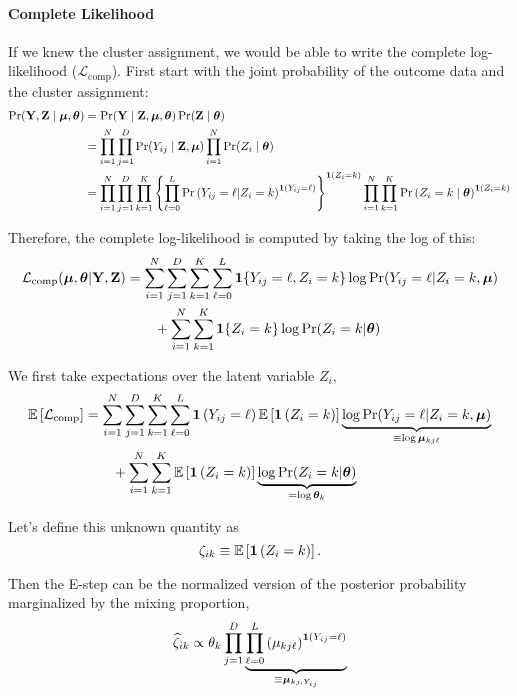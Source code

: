 \documentclass[11pt]{article}
\begin{document}
\paragraph{Complete Likelihood} If we knew the cluster assignment, we would be able to write the complete log-likelihood (\(\mathcal{L}_{\text{comp}}\)). First start with the joint probability of the outcome data and the cluster assignment:
\begin{align}
\Pr(\mathbf{Y}, \mathbf{Z} \mid \bm{\mu}, \bm{\theta}) &= \Pr(\mathbf{Y} \mid \mathbf{Z}, \bm{\mu}, \bm{\theta})\Pr(\mathbf{Z} \mid \bm{\theta})\nonumber\\
&= \prod^{N}_{i=1}\prod^{D}_{j=1}\Pr(Y_{ij} \mid \mathbf{Z}, \bm{\mu}) \prod^N_{i=1}\Pr(Z_i \mid \bm{\theta})\nonumber\\
&= \prod^{N}_{i=1}\prod^{D}_{j=1}\prod^{K}_{k=1}\left\{\prod^{L}_{\ell=0}\mathbb{\Pr}\left(Y_{ij} = \ell | Z_i = k\right)^{\bm{1}\left(Y_{ij} = \ell\right)}\right\}^{\bm{1}\left(Z_i=k\right)} \prod^N_{i=1}\prod^K_{k=1}\mathbb{\Pr}\left(Z_i = {k} \mid \bm{\theta}\right)^{\bm{1}\left(Z_i = k\right)}\nonumber
\end{align}

Therefore, the complete log-likelihood is computed by taking the log of this:
\begin{align}
\mathcal{L}_{\text{comp}}(\bm{\mu}, \bm{\theta}|\mathbf{Y}, \mathbf{Z})
& = \sum^{N}_{i=1}\sum^{D}_{j=1}\sum^{K}_{k=1}\sum^{L}_{\ell = 0}
\bm{1}\{Y_{ij} = \ell, Z_{i} = k\}
\log \Pr(Y_{ij} = \ell | Z_{i} = k, \bm{\mu})\nonumber\\
& \qquad +
\sum^N_{i=1}\sum^{K}_{k=1}\bm{1}\{Z_{i} = k\}\log \Pr(Z_{i} = k | \bm{\theta})
\end{align}

We first take expectations over the latent variable $Z_{i}$,
\begin{align}
\mathbb{E}\left[\mathcal{L}_{\text{comp}}\right]
& = \sum^{N}_{i=1}\sum^{D}_{j=1}\sum^{K}_{k=1}\sum^{L}_{\ell = 0}
\bm{1}\left(Y_{ij} = \ell\right) \mathbb{E}\left[\bm{1}\left(Z_{i} = k\right)\right]
\underbrace{\log \Pr(Y_{ij} = \ell | Z_{i} = k, \bm{\mu})}_{\equiv \log\bm{\mu}_{kj\ell}}
\nonumber\\
& \qquad +
\sum^{N}_{i=1}\sum^{K}_{k=1}\mathbb{E}\left[\bm{1}\left(Z_{i} = k\right)\right]\underbrace{\log \Pr(Z_{i} = k | \bm{\theta})}_{= \log \bm{\theta}_{k}} \label{eq:Elik}
\end{align}

 Let's define this unknown quantity as 
\[\zeta_{ik} \equiv \mathbb{E}\left[\bm{1}\left(Z_i = k\right)\right].\]

Then the E-step can be the normalized version of the posterior probability marginalized by the mixing proportion,
\begin{align}
\widehat{\zeta}_{ik} \propto \theta_k\prod^D_{j = 1}\underbrace{\prod^{L}_{\ell = 0}\left(\mu_{kj\ell}\right)^{\bm{1}\left(Y_{ij} = \ell\right)}}_{\equiv \bm{\mu}_{kj, Y_{ij}}}
\end{align}
\end{document}
